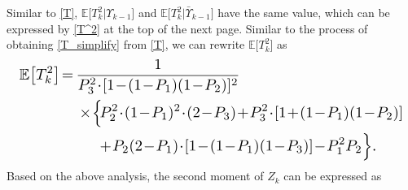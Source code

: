 \documentclass{IEEEtran}
\begin{document}
Similar to \eqref{T}, $\mathbb{E}\big[T_k^2|
\Upsilon_{k-1}\big]$ and $\mathbb{E}\big[T_k^2|\bar{\Upsilon}_{k-1}\big]$ have the same value, which can be expressed by \eqref{T^2} at the top of the next page. Similar to the process of obtaining \eqref{T_simplify} from \eqref{T}, we can rewrite $\mathbb{E}\big[T_k^2\big]$ as
\begin{equation}\label{T^2_simplify}
\resizebox{.98\hsize}{!}{$\begin{aligned}
	\mathbb{E}\big[T_k^2\big]\!=\!\ &\frac{1}{P_3^2\!\cdot\![1\!-\!(1\!-\!P_1)(1\!-\!P_2)]^2}\\
	&\times\!\Big\{\!P_2^2\!\cdot\!(1\!-\!P_1)^2\!\cdot\!(2\!-\!P_3)\!+\!P_3^2\!\cdot\![1\!+\!(1\!-\!P_1)(1\!-\!P_2)]\\
	&\quad \ +\!P_2(2\!-\!P_1)\!\cdot\![1\!-\!(1\!-\!P_1)(1\!-\!P_3)]\!-\!P_1^2P_2\Big\}.
	\end{aligned}$}
\end{equation}
Based on the above analysis, the second moment of $Z_k$ can be expressed as
\end{document}
